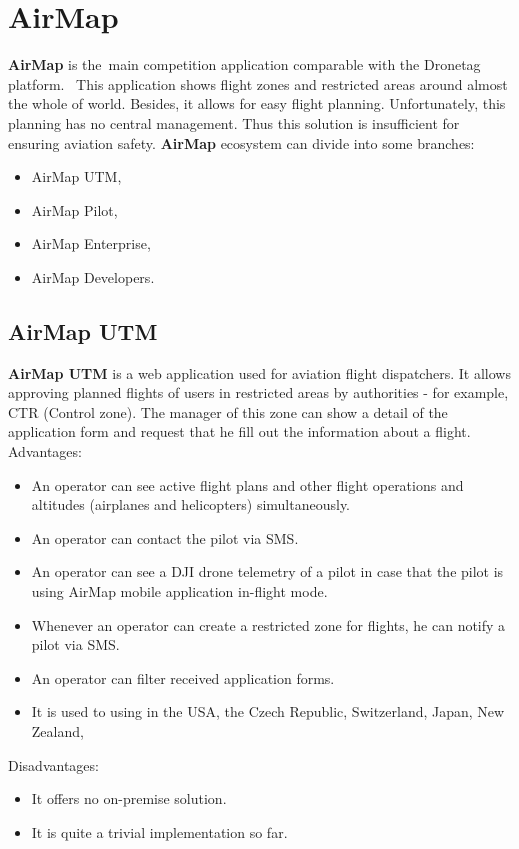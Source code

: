 \section{AirMap}\label{sec:airmap}
\textbf{AirMap} is the~main competition application comparable with the Dronetag platform.~\cite{airMap}
This application shows flight zones and restricted areas around almost the whole of world.
Besides, it allows for easy flight planning.
Unfortunately, this planning has no central management.
Thus this solution is insufficient for ensuring aviation safety.
\textbf{AirMap} ecosystem can divide into some branches:
\begin{itemize}
    \item AirMap UTM,
    \item AirMap Pilot,
    \item AirMap Enterprise,
    \item AirMap Developers.
\end{itemize}

\subsection{AirMap UTM}\label{subsec:airmap-utm}
\textbf{AirMap UTM} is a web application used for aviation flight dispatchers.
It allows approving planned flights of users in restricted areas by authorities - for example, CTR (Control zone).
The manager of this zone can show a detail of the application form and request that he fill out the information about a flight.
\newline
\newline
Advantages:
\begin{itemize}
    \item An operator can see active flight plans and other flight operations and altitudes (airplanes and helicopters) simultaneously.
    \item An operator can contact the pilot via SMS.
    \item An operator can see a DJI drone telemetry of a pilot in case that the pilot is using AirMap mobile application in-flight mode.
    \item Whenever an operator can create a restricted zone for flights, he can notify a pilot via SMS.
    \item An operator can filter received application forms.
    \item It is used to using in the USA, the Czech Republic, Switzerland, Japan, New Zealand, \textellipsis
\end{itemize}
Disadvantages:
\begin{itemize}
    \item It offers no on-premise solution.
    \item It is quite a trivial implementation so far.
\end{itemize}


